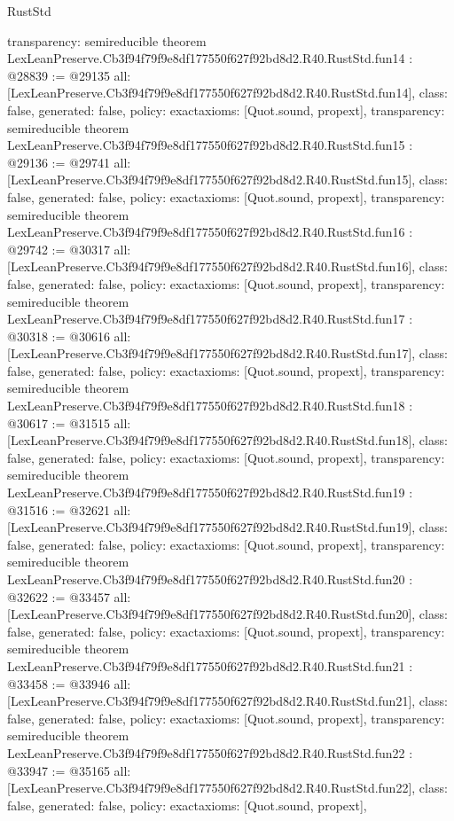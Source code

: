 \begin{lexlean}{RustStd}
\begin{coremodule}
{  transparency: semireducible
}
theorem LexLeanPreserve.Cb3f94f79f9e8df177550f627f92bd8d2.R40.RustStd.fun14 : @28839 := @29135 {
  all: [LexLeanPreserve.Cb3f94f79f9e8df177550f627f92bd8d2.R40.RustStd.fun14],
  class: false,
  generated: false,
  policy: exact{axioms: [Quot.sound, propext]},
  transparency: semireducible
}
theorem LexLeanPreserve.Cb3f94f79f9e8df177550f627f92bd8d2.R40.RustStd.fun15 : @29136 := @29741 {
  all: [LexLeanPreserve.Cb3f94f79f9e8df177550f627f92bd8d2.R40.RustStd.fun15],
  class: false,
  generated: false,
  policy: exact{axioms: [Quot.sound, propext]},
  transparency: semireducible
}
theorem LexLeanPreserve.Cb3f94f79f9e8df177550f627f92bd8d2.R40.RustStd.fun16 : @29742 := @30317 {
  all: [LexLeanPreserve.Cb3f94f79f9e8df177550f627f92bd8d2.R40.RustStd.fun16],
  class: false,
  generated: false,
  policy: exact{axioms: [Quot.sound, propext]},
  transparency: semireducible
}
theorem LexLeanPreserve.Cb3f94f79f9e8df177550f627f92bd8d2.R40.RustStd.fun17 : @30318 := @30616 {
  all: [LexLeanPreserve.Cb3f94f79f9e8df177550f627f92bd8d2.R40.RustStd.fun17],
  class: false,
  generated: false,
  policy: exact{axioms: [Quot.sound, propext]},
  transparency: semireducible
}
theorem LexLeanPreserve.Cb3f94f79f9e8df177550f627f92bd8d2.R40.RustStd.fun18 : @30617 := @31515 {
  all: [LexLeanPreserve.Cb3f94f79f9e8df177550f627f92bd8d2.R40.RustStd.fun18],
  class: false,
  generated: false,
  policy: exact{axioms: [Quot.sound, propext]},
  transparency: semireducible
}
theorem LexLeanPreserve.Cb3f94f79f9e8df177550f627f92bd8d2.R40.RustStd.fun19 : @31516 := @32621 {
  all: [LexLeanPreserve.Cb3f94f79f9e8df177550f627f92bd8d2.R40.RustStd.fun19],
  class: false,
  generated: false,
  policy: exact{axioms: [Quot.sound, propext]},
  transparency: semireducible
}
theorem LexLeanPreserve.Cb3f94f79f9e8df177550f627f92bd8d2.R40.RustStd.fun20 : @32622 := @33457 {
  all: [LexLeanPreserve.Cb3f94f79f9e8df177550f627f92bd8d2.R40.RustStd.fun20],
  class: false,
  generated: false,
  policy: exact{axioms: [Quot.sound, propext]},
  transparency: semireducible
}
theorem LexLeanPreserve.Cb3f94f79f9e8df177550f627f92bd8d2.R40.RustStd.fun21 : @33458 := @33946 {
  all: [LexLeanPreserve.Cb3f94f79f9e8df177550f627f92bd8d2.R40.RustStd.fun21],
  class: false,
  generated: false,
  policy: exact{axioms: [Quot.sound, propext]},
  transparency: semireducible
}
theorem LexLeanPreserve.Cb3f94f79f9e8df177550f627f92bd8d2.R40.RustStd.fun22 : @33947 := @35165 {
  all: [LexLeanPreserve.Cb3f94f79f9e8df177550f627f92bd8d2.R40.RustStd.fun22],
  class: false,
  generated: false,
  policy: exact{axioms: [Quot.sound, propext]},
}
\end{coremodule}
\end{lexlean}
